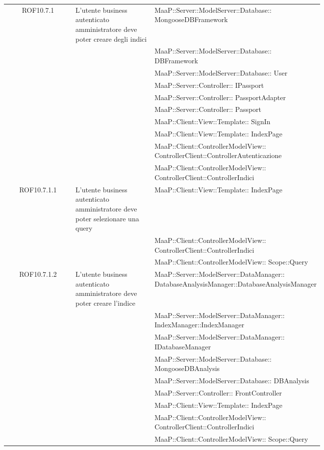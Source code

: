 \begin{center}
\begin{longtable}{|c|p{0.25\linewidth}|p{0.5\linewidth}|}
\midrule
ROF10.7.1
& L'utente business autenticato amministratore deve poter creare degli indici
& MaaP::Server::ModelServer::Database:: MongooseDBFramework\\
& & MaaP::Server::ModelServer::Database:: DBFramework\\
& & MaaP::Server::ModelServer::Database:: User\\
& & MaaP::Server::Controller:: IPassport\\
& & MaaP::Server::Controller:: PassportAdapter\\
& & MaaP::Server::Controller:: Passport\\
& & MaaP::Client::View::Template:: SignIn\\
& & MaaP::Client::View::Template:: IndexPage\\
& & MaaP::Client::ControllerModelView:: ControllerClient::ControllerAutenticazione\\
& & MaaP::Client::ControllerModelView:: ControllerClient::ControllerIndici\\

\midrule
ROF10.7.1.1
& L'utente business autenticato amministratore deve poter selezionare una query
& MaaP::Client::View::Template:: IndexPage\\
& & MaaP::Client::ControllerModelView:: ControllerClient::ControllerIndici\\
& & MaaP::Client::ControllerModelView:: Scope::Query\\

\midrule
ROF10.7.1.2
& L'utente business autenticato amministratore deve poter creare l'indice
& MaaP::Server::ModelServer::DataManager:: DatabaseAnalysisManager::DatabaseAnalysisManager\\
& & MaaP::Server::ModelServer::DataManager:: IndexManager::IndexManager\\
& & MaaP::Server::ModelServer::DataManager:: IDatabaseManager\\
& & MaaP::Server::ModelServer::Database:: MongooseDBAnalysis\\
& & MaaP::Server::ModelServer::Database:: DBAnalysis\\
& & MaaP::Server::Controller:: FrontController\\
& & MaaP::Client::View::Template:: IndexPage\\
& & MaaP::Client::ControllerModelView:: ControllerClient::ControllerIndici\\
& & MaaP::Client::ControllerModelView:: Scope::Query\\


\end{longtable}
\end{center}
